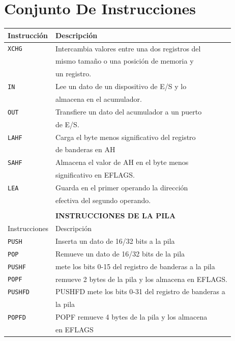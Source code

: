 \documentclass[12pt]{article}
\begin{document}
\section*{Conjunto De Instrucciones}
\label{sec:org92f8d35}
\begin{center}
\begin{tabular}{|l|l|}
\hline
Instrucción & Descripción\\
\hline
\texttt{XCHG} & Intercambia valores entre una dos registros del\\
 & mismo tamaño o una posición de memoria y\\
 & un registro.\\
\hline
\texttt{IN} & Lee un dato de un dispositivo de E/S y lo\\
 & almacena en el acumulador.\\
\hline
\texttt{OUT} & Transfiere un dato del acumulador a un puerto\\
 & de E/S.\\
\hline
\texttt{LAHF} & Carga el byte menos significativo del registro\\
 & de banderas en AH\\
\hline
\texttt{SAHF} & Almacena el valor de AH en el byte menos\\
 & significativo en EFLAGS.\\
\hline
\texttt{LEA} & Guarda en el primer operando la dirección\\
 & efectiva del segundo operando.\\
\hline
 & \\
 & \textbf{INSTRUCCIONES DE LA PILA}\\
\hline
Instrucciones & Descripción\\
\hline
\texttt{PUSH} & Inserta un dato de 16/32 bits a la pila\\
\hline
\texttt{POP} & Remueve un dato de 16/32 bits de la pila\\
\hline
\texttt{PUSHF} & mete los bits 0-15 del registro de banderas a la pila\\
\hline
\texttt{POPF} & remueve 2 bytes de la pila y los almacena en EFLAGS.\\
\hline
\texttt{PUSHFD} & PUSHFD mete los bits 0-31 del registro de banderas a\\
 & la pila\\
\hline
\texttt{POPFD} & POPF remueve 4 bytes de la pila y los almacena\\
 & en EFLAGS\\
\hline
\end{tabular}
\end{center}
\end{document}
